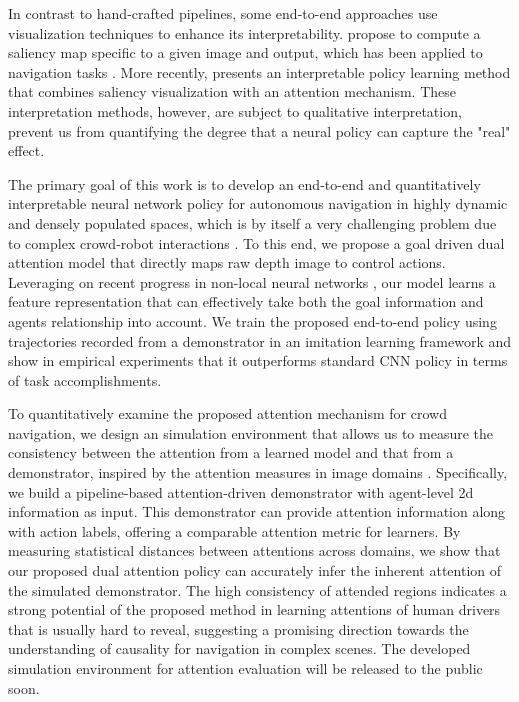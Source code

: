 \documentclass[10pt,twocolumn,letterpaper]{article}
\begin{document}
In contrast to hand-crafted pipelines, some end-to-end approaches use visualization techniques to enhance its interpretability. \cite{simonyan_deep_2013, selvaraju_grad-cam:_2016} propose to compute a saliency map specific to a given image and output, which has been applied to navigation tasks \cite{bojarski_explaining_2017,chi_deep_2017}. More recently, \cite{kim_interpretable_2017} presents an interpretable policy learning method that combines saliency visualization with an attention mechanism. These interpretation methods, however, are subject to qualitative interpretation, prevent us from quantifying the degree that a neural policy can capture the "real" effect. 

The primary goal of this work is to develop an end-to-end and quantitatively interpretable neural network policy for autonomous navigation in highly dynamic and densely populated spaces, which is by itself a very challenging problem due to complex crowd-robot interactions \cite{chen_crowd-robot_2018}. To this end, we propose a goal driven dual attention model that directly maps raw depth image to control actions. Leveraging on recent progress in non-local neural networks \cite{wang_non-local_2017}, our model learns a feature representation that can effectively take both the goal information and agents relationship into account. We train the proposed end-to-end policy using trajectories recorded from a demonstrator in an imitation learning framework and show in empirical experiments that it outperforms standard CNN policy in terms of task accomplishments. 

To quantitatively examine the proposed attention mechanism for crowd navigation, we design an simulation environment that allows us to measure the consistency between the attention from a learned model and that from a demonstrator, inspired by the attention measures in image domains \cite{das_human_2016, liu_neural_2016}. Specifically, we build a pipeline-based attention-driven demonstrator with agent-level 2d information as input. This demonstrator can provide attention information along with action labels, offering a comparable attention metric for learners. By measuring statistical distances between attentions across domains, we show that our proposed dual attention policy can accurately infer the inherent attention of the simulated demonstrator. The high consistency of attended regions indicates a strong potential of the proposed method in learning attentions of human drivers that is usually hard to reveal, suggesting a promising direction towards the understanding of causality for navigation in complex scenes. The developed simulation environment for attention evaluation will be released to the public soon. 
\end{document}
